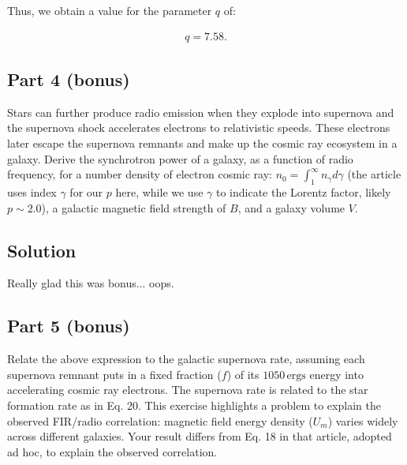 \documentclass[12pt]{article}
\begin{document}
{\noindent}Thus, we obtain a value for the parameter $q$ of:

\begin{align*}
    \boxed{q = 7.58}.
\end{align*}


\subsection*{Part 4 (bonus)}

Stars can further produce radio emission when they explode into supernova and the supernova shock accelerates electrons to relativistic speeds. These electrons later escape the supernova remnants and make up the cosmic ray ecosystem in a galaxy. Derive the synchrotron power of a galaxy, as a function of radio frequency, for a number density of electron cosmic ray: $n_0 = \int_1^\infty n_\gamma d\gamma$ (the article uses index $\gamma$ for our $p$ here, while we use $\gamma$ to indicate the Lorentz factor, likely $p\sim2.0$), a galactic magnetic field strength of $B$, and a galaxy volume $V$.


\subsection*{Solution}

Really glad this was bonus... oops.


\subsection*{Part 5 (bonus)}

Relate the above expression to the galactic supernova rate, assuming each supernova remnant puts in a fixed fraction ($f$) of its $1050\,\mathrm{ergs}$ energy into accelerating cosmic ray electrons. The supernova rate is related to the star formation rate as in Eq. 20. This exercise highlights a problem to explain the observed FIR/radio correlation: magnetic field energy density ($U_m$) varies widely across different galaxies. Your result differs from Eq. 18 in that article, adopted ad hoc, to explain the observed correlation.
\end{document}
